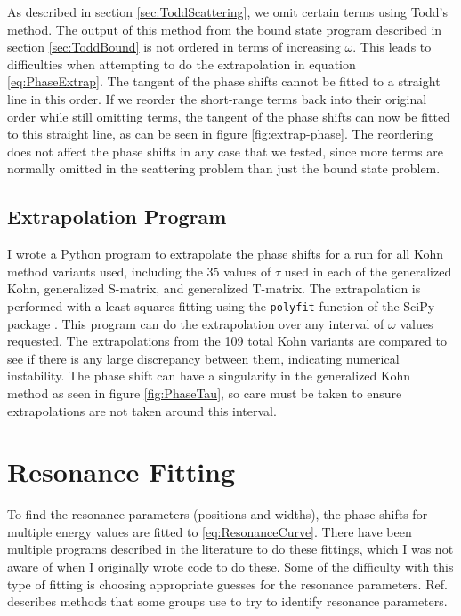 \documentclass[Dissertation.tex]{subfiles}
\begin{document}
As described in section \ref{sec:ToddScattering}, we omit certain terms using Todd's method. The output of this method from the bound state program described in section \ref{sec:ToddBound} is not ordered in terms of increasing $\omega$. This leads to difficulties when attempting to do the extrapolation in equation \ref{eq:PhaseExtrap}. The tangent of the phase shifts cannot be fitted to a straight line in this order. If we reorder the short-range terms back into their original order while still omitting terms, the tangent of the phase shifts can now be fitted to this straight line, as can be seen in figure \ref{fig:extrap-phase}. The reordering does not affect the phase shifts in any case that we tested, since more terms are normally omitted in the scattering problem than just the bound state problem.

\subsection{Extrapolation Program}
I wrote a Python \cite{Python} program to extrapolate the phase shifts for a run for all Kohn method variants used, including the 35 values of $\tau$ used in each of the generalized Kohn, generalized S-matrix, and generalized T-matrix. The extrapolation is performed with a least-squares fitting using the \texttt{polyfit} function of the SciPy package \cite{SciPy}. This program can do the extrapolation over any interval of $\omega$ values requested. The extrapolations from the 109 total Kohn variants are compared to see if there is any large discrepancy between them, indicating numerical instability. The phase shift can have a singularity in the generalized Kohn method as seen in figure \ref{fig:PhaseTau}, so care must be taken to ensure extrapolations are not taken around this interval.



\section{Resonance Fitting}
\label{sec:ResonanceFit}

To find the resonance parameters (positions and widths), the phase shifts for multiple energy values are fitted to \cref{eq:ResonanceCurve}. There have been multiple programs described in the literature \cite{Tennyson1984, Stibbe1998, Sochi2013} to do these fittings, which I was not aware of when I originally wrote code to do these. Some of the difficulty with this type of fitting is choosing appropriate guesses for the resonance parameters. Ref.~\cite{Sochi2013} describes methods that some groups use to try to identify resonance parameters.
\end{document}
